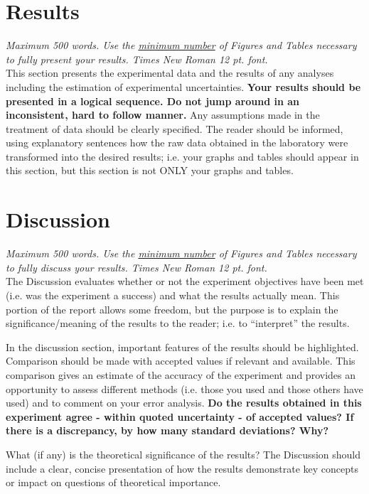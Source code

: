 \documentclass[letterpaper,12pt]{article}
\begin{document}
\section{Results}
{\it Maximum 500 words.  Use the \underline{minimum number} of Figures and Tables
  necessary to fully present your results. Times New Roman 12 
  pt. font.}\\


This section presents the experimental data and the results of any
analyses including the estimation of experimental uncertainties.  {\bf
  Your
results should be presented in a logical sequence.  Do not jump around
in an inconsistent, hard to follow manner.} Any assumptions made in the
treatment of data should be clearly specified.  The reader should be
informed, using explanatory sentences how the raw data obtained in the
laboratory were transformed into the desired results; i.e. your graphs
and tables should appear in this section, but this section is not ONLY
your graphs and tables.


\section{Discussion}
{\it Maximum 500 words.  Use the \underline{minimum number} of Figures and Tables
  necessary to fully discuss your results. Times New Roman 12 
  pt. font.}\\

The Discussion evaluates whether or not the experiment objectives have
been met (i.e. was the experiment a success) and what the results
actually mean. This portion of the report allows some freedom, but the
purpose is to explain the significance/meaning of the results to the
reader; i.e. to ``interpret'' the results.

In the discussion section, important features of the results should be
highlighted. Comparison should be made with accepted values if
relevant and available.  This comparison gives an estimate of the
accuracy of the experiment and provides an opportunity to assess
different methods (i.e. those you used and those others have used) and
to comment on your error analysis. {\bf Do the results obtained in this
experiment agree - within quoted uncertainty - of accepted values? If
there is a discrepancy, by how many standard deviations?  Why?}

What (if any) is the theoretical significance of the results? The
Discussion should include a clear, concise presentation of how the
results demonstrate key concepts or impact on questions of theoretical
importance.
\end{document}
